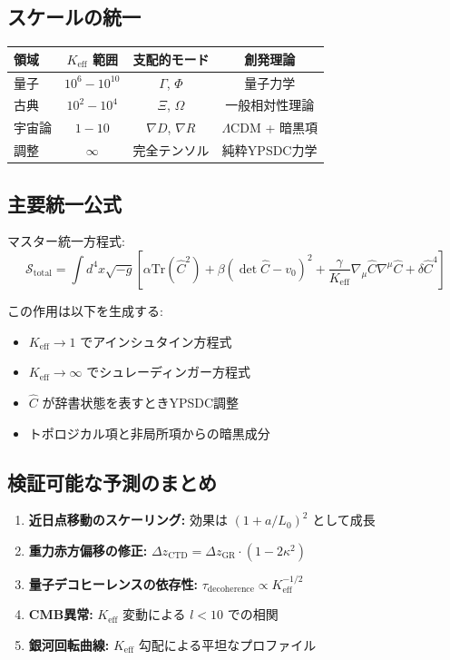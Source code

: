 \documentclass[11pt,a4paper]{article}
\begin{document}
	\subsection{スケールの統一}
	
	\begin{table}[htbp]
		\centering
		
			\begin{tabular}{lccc}
				\toprule
				\textbf{領域} & \textbf{$K_{\mathrm{eff}}$ 範囲} & \textbf{支配的モード} & \textbf{創発理論} \\
				\midrule
				量子 & $10^6-10^{10}$ & $\Gamma$, $\Phi$ & 量子力学 \\
				古典 & $10^2-10^4$ & $\Xi$, $\Omega$ & 一般相対性理論 \\
				宇宙論 & $1-10$ & $\nabla D$, $\nabla R$ & $\Lambda$CDM + 暗黒項 \\
				調整 & $\infty$ & 完全テンソル & 純粋YPSDC力学 \\
				\bottomrule
			\end{tabular}
		
	\end{table}
	
	\subsection{主要統一公式}
	
	マスター統一方程式:
	\[
	\boxed{\mathcal{S}_{\mathrm{total}} = \int d^{4}x \sqrt{-g} \left[ \alpha \mathrm{Tr}(\hat{C}^2) + \beta (\det\hat{C} - v_0)^2 + \frac{\gamma}{K_{\mathrm{eff}}} \nabla_\mu\hat{C}\nabla^\mu\hat{C} + \delta \hat{C}^4 \right]}
	\]
	
	この作用は以下を生成する:
	\begin{itemize}
		\item $K_{\mathrm{eff}} \to 1$ でアインシュタイン方程式
		\item $K_{\mathrm{eff}} \to \infty$ でシュレーディンガー方程式
		\item $\hat{C}$ が辞書状態を表すときYPSDC調整
		\item トポロジカル項と非局所項からの暗黒成分
	\end{itemize}
	
	\subsection{検証可能な予測のまとめ}
	
	\begin{enumerate}
		\item \textbf{近日点移動のスケーリング:} 効果は $(1 + a/L_0)^2$ として成長
		\item \textbf{重力赤方偏移の修正:} $\Delta z_{\mathrm{CTD}} = \Delta z_{\mathrm{GR}} \cdot (1 - 2\kappa^2)$
		\item \textbf{量子デコヒーレンスの依存性:} $\tau_{\mathrm{decoherence}} \propto K_{\mathrm{eff}}^{-1/2}$
		\item \textbf{CMB異常:} $K_{\mathrm{eff}}$ 変動による $l < 10$ での相関
		\item \textbf{銀河回転曲線:} $K_{\mathrm{eff}}$ 勾配による平坦なプロファイル
	\end{enumerate}
	
\end{document}
